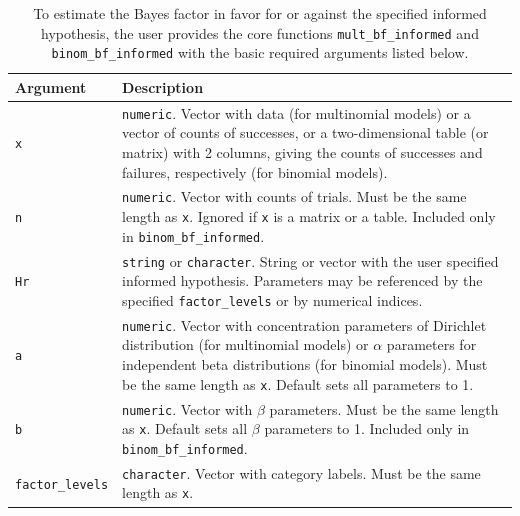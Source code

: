 \documentclass[
  english,
  man,floatsintext]{apa6}
\begin{document}
\begin{table}[H]
\caption{To estimate the Bayes factor in favor for or against the specified informed hypothesis, the user provides the core functions \texttt{mult\_bf\_informed} and \texttt{binom\_bf\_informed} with the basic required arguments listed below.}
\label{table:arguments}
\begin{center}
\begin{tabular}{p{4cm}p{12cm}}
        \toprule
Argument & Description \\\midrule
\texttt{x} & \texttt{numeric}. Vector with data (for multinomial models) or a vector of counts of successes, or a two-dimensional table (or matrix) with 2 columns, giving the counts of successes and failures, respectively (for binomial models).  \\
\texttt{n} &  \texttt{numeric}. Vector with counts of trials. Must be the same length as \texttt{x}. Ignored if \texttt{x} is a matrix or a table. Included only in \texttt{binom\_bf\_informed}. \\
\texttt{Hr} & \texttt{string} or \texttt{character}. String or vector with the user specified informed hypothesis. Parameters may be referenced by the specified \texttt{factor\_levels} or by numerical indices.\\
\texttt{a} & \texttt{numeric}. Vector with concentration parameters of Dirichlet distribution (for multinomial models) or $\alpha$ parameters for independent beta distributions (for binomial models). Must be the same length as \texttt{x}. Default sets all parameters to 1. \\
\texttt{b} & \texttt{numeric}. Vector with $\beta$ parameters. Must be the same length as \texttt{x}. Default sets all $\beta$ parameters to 1. Included only in \texttt{binom\_bf\_informed}.\\
\texttt{factor\_levels} &  \texttt{character}. Vector with category labels. Must be the same length as \texttt{x}.\\
\bottomrule
\end{tabular}
\end{center}
\end{table}
\end{document}

